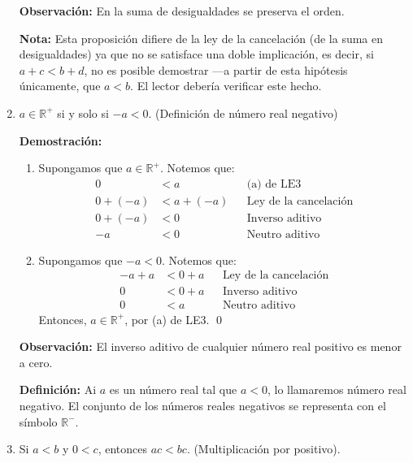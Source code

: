 \documentclass[11pt]{article}
\newcommand{\R}{\mathbb{R}}
\let\set\Set
\begin{document}
\begin{enumerate}[label=\alph*)]
    \textbf{Observación:} En la suma de desigualdades se preserva el orden.

    \textbf{Nota:} Esta proposición difiere de la ley de la cancelación (de la suma en desigualdades) ya que no se satisface una doble implicación, es decir, si $a+c<b+d$, no es posible demostrar —a partir de esta hipótesis únicamente, que $a<b$. El lector debería verificar este hecho.%

    \item $a \in \R^+$ si y solo si $-a<0$. (Definición de número real negativo)
    
    \textbf{Demostración:} \begin{enumerate}[label=\roman*)]
        \item Supongamos que $a \in \R^+$. Notemos que: \begin{align*}
            0 &< a && \text{(a) de LE3}\\
            0 + (-a) &< a + (-a) && \text{Ley de la cancelación}\\
            0 + (-a) &< 0 && \text{Inverso aditivo}\\
            -a &< 0 && \text{Neutro aditivo}
        \end{align*}
        \item Supongamos que $-a<0$. Notemos que:
        \begin{align*}
            -a + a &< 0 + a && \text{Ley de la cancelación}\\
            0 &< 0 + a && \text{Inverso aditivo}\\
            0 &< a && \text{Neutro aditivo}
        \end{align*}Entonces, $a \in \R^+$, por (a) de LE3. \qed
        \end{enumerate}

    \textbf{Observación:} El inverso aditivo de cualquier número real positivo es menor a cero.

    \textbf{Definición:} Ai $a$ es un número real tal que $a<0$, lo llamaremos número real negativo. El conjunto de los números reales negativos se representa con el símbolo $\R^-$.

    \item Si $a<b$ y $0<c$, entonces $ac<bc$. (Multiplicación por positivo).
    

\end{enumerate}
\end{document}
